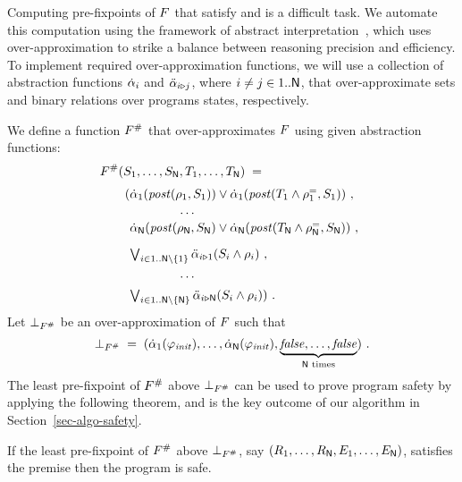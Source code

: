 Computing pre-fixpoints of $F$ that satisfy  and
 is a difficult task.
We automate this computation using the framework of abstract
interpretation~\cite{lattice77}, which uses over-approximation to
strike a balance between reasoning precision and efficiency.
To implement required over-approximation functions, we will use a
collection of abstraction functions $\dot{\alpha}_{i}$ and
$\ddot{\alpha}_{i\triangleright j}$, where $i \neq j \in1..\mathsf{N}$, that
over-approximate sets and binary relations over programs states,
respectively.

We define a function ${F^{\#}}$ that over-approximates $F$
using given abstraction functions:
%
\begin{equation}\label{eq-func}
  \begin{split}
    & \eqFunc(S_1, \dots, S_\Num, T_1, \dots, T_\Num) \defeq \\[\jot]
    &\qquad  (
    \begin{array}[t]{@{}l}
      \abst_1(\post(\relTIdOf{1}, S_1)) \lor 
      \abst_1(\post(T_1 \land \relLocEqOf{1}, S_1))\ , \\[\jot]
      \qquad\qquad\cdots\\
      \abst_\Num(\post(\relTIdOf{\Num}, S_\Num) \lor 
      \abst_\Num(\post(T_\Num \land \relLocEqOf{\Num}, S_\Num))\ ,
    \\[3\jot]
    \Lor_{i\in\ThreadIds\setminus\set{1}}\abstTransTIdOf{i}{1}(S_i \land \relTIdOf{i})\ ,\\[2\jot]
    \qquad\qquad\cdots \\[\jot]
    \Lor_{i\in\ThreadIds\setminus\set{\Num}}\abstTransTIdOf{i}{\Num}(S_i \land \relTIdOf{i} ))\ .
  \end{array}
\end{split}
\end{equation} 
%
Let $\bot_{{F^{\#}}}$ be an over-approximation of $F$ such that
%
\begin{equation}\label{eq-bot}
  \bot_{{F^{\#}}} \;=\; (\dot{\alpha}_1(\varphi_{\mathit{init}}),\dots,\dot{\alpha}_{\mathsf{N}}(\varphi_{\mathit{init}}), \underbrace{\mathit{false}, \dots,
    \mathit{false}}_{\mathsf{N} \text{ times}})\ .
\end{equation}
%
The least pre-fixpoint of ${F^{\#}}$ above $\bot_{{F^{\#}}}$ can be used to
prove program safety by applying the following theorem, and is the key
outcome of our algorithm in Section~\ref{sec-algo-safety}.
%
\begin{theorem}\label{thm-abst-fix}
    If the least pre-fixpoint of ${F^{\#}}$ above $\bot_{{F^{\#}}}$, say
$(R_1, \dots, R_{\mathsf{N}}, E_1, \dots, E_{\mathsf{N}})$, satisfies
the premise \emph{} then the program is safe.\eofClaim
\end{theorem}
%

